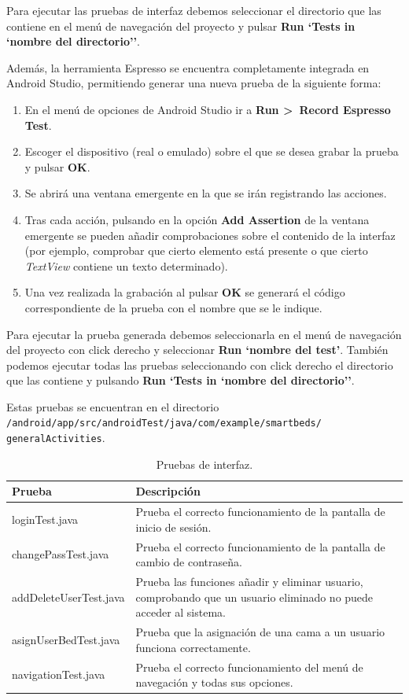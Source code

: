 Para ejecutar las pruebas de interfaz debemos seleccionar el directorio que las contiene en el menú de navegación del proyecto y pulsar \textbf{Run `Tests in `nombre del directorio''}. 

Además, la herramienta Espresso se encuentra completamente integrada en Android Studio, permitiendo generar una nueva prueba de la siguiente forma:

\begin{enumerate}
	\item En el menú de opciones de Android Studio ir a \textbf{Run >~Record Espresso Test}. 
	\item Escoger el dispositivo (real o emulado) sobre el que se desea grabar la prueba y pulsar \textbf{OK}. 
	\item Se abrirá una ventana emergente en la que se irán registrando las acciones. 
	\item Tras cada acción, pulsando en la opción \textbf{Add Assertion} de la ventana emergente se pueden añadir comprobaciones sobre el contenido de la interfaz (por ejemplo, comprobar que cierto elemento está presente o que cierto \textit{TextView} contiene un texto determinado). 
	\item Una vez realizada la grabación al pulsar \textbf{OK} se generará el código correspondiente de la prueba con el nombre que se le indique. 
\end{enumerate} 

Para ejecutar la prueba generada debemos seleccionarla en el menú de navegación del proyecto con click derecho y seleccionar \textbf{Run `nombre del test'}. También podemos ejecutar todas las pruebas seleccionando con click derecho el directorio que las contiene y pulsando \textbf{Run `Tests in `nombre del directorio''}. 

Estas pruebas se encuentran en el directorio \\ \texttt{/android/app/src/androidTest/java/com/example/smartbeds/\\generalActivities}.


\begin{table}[H]
	\begin{tabularx}{\textwidth}{lX}
		\toprule 
		\textbf{Prueba} & \textbf{Descripción}\\
		\midrule
		loginTest.java & Prueba el correcto funcionamiento de la pantalla de inicio de sesión. \\
		changePassTest.java & Prueba el correcto funcionamiento de la pantalla de cambio de contraseña. \\
		addDeleteUserTest.java & Prueba las funciones añadir y eliminar usuario, comprobando que un usuario eliminado no puede acceder al sistema. \\
		asignUserBedTest.java & Prueba que la asignación de una cama a un usuario funciona correctamente. \\
		navigationTest.java & Prueba el correcto funcionamiento del menú de navegación y todas sus opciones. \\
		\bottomrule
	\end{tabularx}
	\caption{Pruebas de interfaz.}
\end{table}

